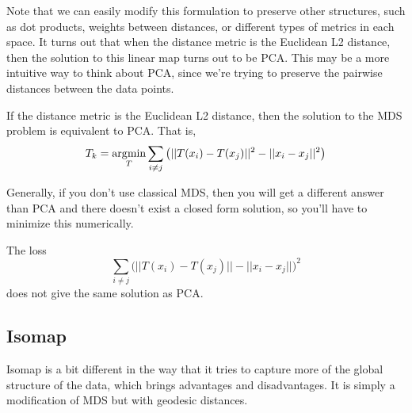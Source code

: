    Note that we can easily modify this formulation to preserve other structures, such as dot products, weights between distances, or different types of metrics in each space. It turns out that when the distance metric is the Euclidean L2 distance, then the solution to this linear map turns out to be PCA. This may be a more intuitive way to think about PCA, since we're trying to preserve the pairwise distances between the data points. 

    \begin{theorem}
      If the distance metric is the Euclidean L2 distance, then the solution to the MDS problem is equivalent to PCA. That is, 
      \begin{equation}
        T_k = \operatorname*{\arg\!\min}_{T} \sum_{i \neq j} \big( ||T(x_i) - T(x_j)||^2 - ||x_i - x_j||^2 \big)
      \end{equation}
    \end{theorem}

    Generally, if you don't use classical MDS, then you will get a different answer than PCA and there doesn't exist a closed form solution, so you'll have to minimize this numerically. 

    \begin{example}
      The loss 
      \begin{equation}
        \sum_{i \neq j}  \big( ||T(x_i) - T(x_j)|| - ||x_i - x_j|| \big)^2 
      \end{equation}
      does not give the same solution as PCA. 
    \end{example}

  \subsection{Isomap} 

    Isomap is a bit different in the way that it tries to capture more of the global structure of the data, which brings advantages and disadvantages. It is simply a modification of MDS but with geodesic distances. 

